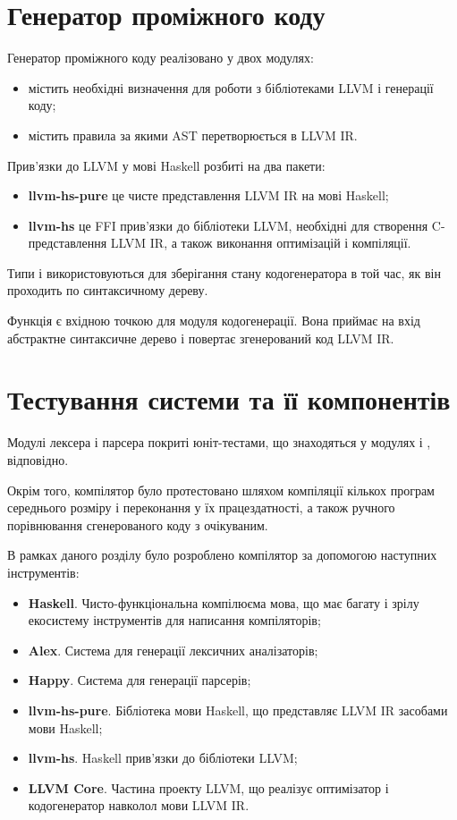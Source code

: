 \documentclass[main.tex]{subfiles}
\begin{document}
\FloatBarrier
\section{Генератор проміжного коду}
Генератор проміжного коду реалізовано у двох модулях:
\begin{itemize}
\item {} містить необхідні визначення для роботи з бібліотеками LLVM і генерації коду;
\item {} містить правила за якими AST перетворюється в LLVM IR.
\end{itemize}

Прив'язки до LLVM у мові Haskell розбиті на два пакети:
\begin{itemize}[nosep]
\item \textbf{llvm-hs-pure} це чисте представлення LLVM IR на мові Haskell;
\item \textbf{llvm-hs} це FFI прив'язки до бібліотеки LLVM, необхідні для створення C-представлення LLVM IR, а також виконання оптимізацій і компіляції.
\end{itemize}

Типи  і  використовуються для зберігання стану кодогенератора в той час, як він проходить по синтаксичному дереву.

Функція  є вхідною точкою для модуля кодогенерації.
Вона приймає на вхід абстрактне синтаксичне дерево і повертає згенерований код LLVM IR.

\section{Тестування системи та її компонентів}
Модулі лексера і парсера покриті юніт-тестами, що знаходяться у модулях  і , відповідно.

Окрім того, компілятор було протестовано шляхом компіляції кількох програм середнього розміру і переконання у їх працездатності, а також ручного порівнювання сгенерованого коду з очікуваним.

\chapterconslusions{}
В рамках даного розділу було розроблено компілятор за допомогою наступних інструментів:
\begin{itemize}
\item \textbf{Haskell}. Чисто-функціональна компілюєма мова, що має багату і зрілу екосистему інструментів для написання компіляторів;
\item \textbf{Alex}. Система для генерації лексичних аналізаторів;
\item \textbf{Happy}. Система для генерації парсерів;
\item \textbf{llvm-hs-pure}. Бібліотека мови Haskell, що представляє LLVM IR засобами мови Haskell;
\item \textbf{llvm-hs}. Haskell прив'язки до бібліотеки LLVM;
\item \textbf{LLVM Core}. Частина проекту LLVM, що реалізує оптимізатор і кодогенератор навколол мови LLVM IR.
\end{itemize}
\end{document}
